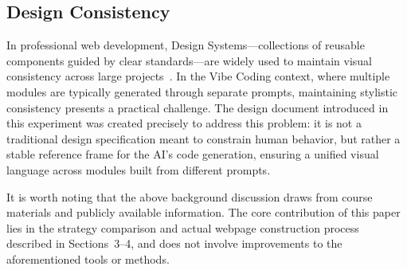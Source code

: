 \subsection{Design Consistency}

In professional web development, Design Systems---collections of reusable components guided by clear standards---are widely used to maintain visual consistency across large projects~\cite{kholmatova2017design}.
In the Vibe Coding context, where multiple modules are typically generated through separate prompts, maintaining stylistic consistency presents a practical challenge.
The design document introduced in this experiment was created precisely to address this problem: it is not a traditional design specification meant to constrain human behavior, but rather a stable reference frame for the AI's code generation, ensuring a unified visual language across modules built from different prompts.

It is worth noting that the above background discussion draws from course materials and publicly available information. The core contribution of this paper lies in the strategy comparison and actual webpage construction process described in Sections~3--4, and does not involve improvements to the aforementioned tools or methods.
